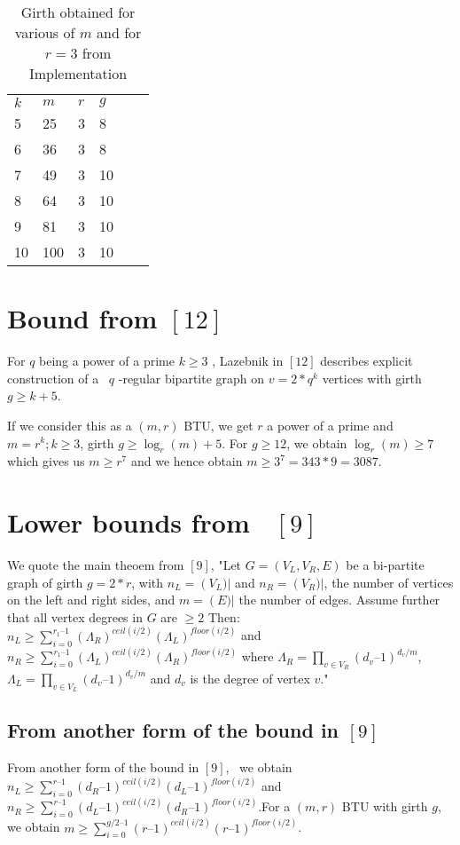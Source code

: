 \documentclass{llncs}
\begin{document}
\begin{table}
\caption{Girth obtained for various of $m$ and for $r = 3$ from Implementation}
\begin{tabular}{llllll}
\hline\noalign{\smallskip}
$k$ & $m$ & $r$ & $g$ \\
\noalign{\smallskip}
\hline
\noalign{\smallskip}
5 & 25 & 3 & 8 \\
6 & 36 & 3 & 8  \\
7 & 49 & 3 & 10 \\
8 & 64 & 3 & 10 \\
9 & 81 & 3 & 10  \\
10 & 100 & 3 & 10 \\
\hline
\end{tabular}
\end{table}

\section {Bound from $[12]$}
For $q$ being a power of a prime $k\ge 3$ , Lazebnik in  $[12]$ describes explicit construction of a \  $q$ {}-regular bipartite graph on  $v=2\ast q^{k}$ vertices with girth  $g\ge k+5$.

If we consider this as a $(m,r)$ BTU, we get  $r$ a power of a prime and  $m=r^{k};k\ge 3$, girth  $g\ge \log _{r}(m)+5$. For  $g\ge 12$, we obtain  $\log _{r}(m)\ge 7$ which gives us  $m\ge r^{7}$ and we hence obtain $m\ge 3^{7}=343\ast 9=3087$.

\section {Lower bounds from \ $[9]$}
We quote the main theoem from $[9]$, "Let $G= (V_{L}, V_{R}, E)$ be a bi-partite graph of girth $g = 2 \ast r$, with $n_{L}=\left(V_{L})\right|$ and $n_{R}=\left(V_{R})\right|$, the number of vertices on the left and right sides, and $m=\left(E)\right|$ the number of edges. Assume further that all vertex degrees in $G$ are $\ge 2$ Then: $n_{L}\ge \sum _{i=0}^{r_{1}\text{--}1}(\Lambda _{R})^{\mathit{ceil}(i/2)}(\Lambda _{L})^{\mathit{floor}(i/2)}$ and  $n_{R}\ge \sum _{i=0}^{r_{1}\text{--}1}(\Lambda _{L})^{\mathit{ceil}(i/2)}(\Lambda _{R})^{\mathit{floor}(i/2)}$ where  $\Lambda _{R}=\prod _{v\in V_{R}}(d_{v}\text{--}1)^{d_{v}/m}$,  $\Lambda _{L}=\prod _{v\in V_{L}}(d_{v}\text{--}1)^{d_{v}/m}$ and $d_{v}$ is the degree of vertex $v$."

\subsection {From another form of the bound in $[9]$}
From another form of the bound in  $[9]$, \ we obtain $n_{L}\ge \sum _{i=0}^{r\text{--}1}(d_{R}\text{--}1)^{\mathit{ceil}(i/2)}(d_{L}\text{--}1)^{\mathit{floor}(i/2)}$ and  $n_{R}\ge \sum _{i=0}^{r\text{--}1}(d_{L}\text{--}1)^{\mathit{ceil}(i/2)}(d_{R}\text{--}1)^{\mathit{floor}(i/2)}$.For a $(m,r)$ BTU with girth  $g$, we obtain  $m\ge \sum _{i=0}^{g/2\text{--}1}(r\text{--}1)^{\mathit{ceil}(i/2)}(r\text{--}1)^{\mathit{floor}(i/2)}$.
\end{document}
